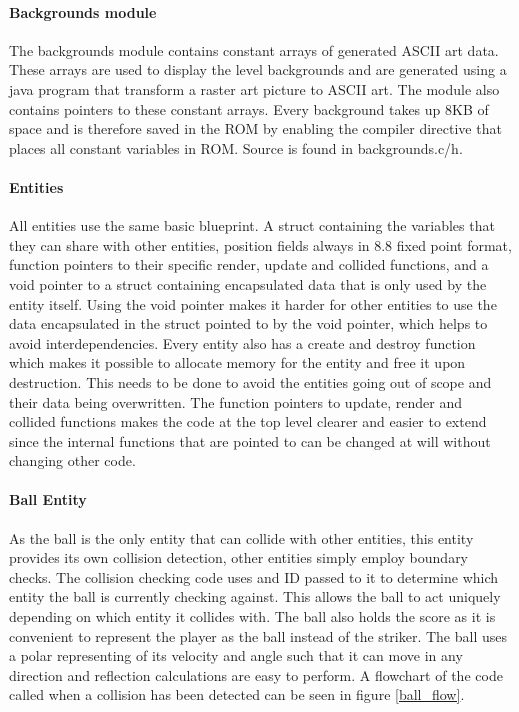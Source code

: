 \paragraph{Backgrounds module}
The backgrounds module contains constant arrays of generated ASCII art data. These arrays are used
to display the level backgrounds and are generated using a java program that transform a raster
art picture to ASCII art. The module also contains pointers to these constant arrays. Every
background takes up 8KB of space and is therefore saved in the ROM by enabling the compiler
directive that places all constant variables in ROM. Source is found in backgrounds.c/h.

\paragraph{Entities}
All entities use the same basic blueprint. A struct containing the variables that they can share
with other entities, position fields always in 8.8 fixed point format, function pointers
 to their specific render, update and collided functions, and
a void pointer to a struct containing encapsulated data that is only used by the entity itself. 
Using the void pointer makes it harder for other entities to use the data encapsulated in the
struct pointed to by the void pointer, which helps to avoid interdependencies. Every entity also
has a create and destroy function which makes it possible to allocate memory for the entity
and free it upon destruction. This needs to be done to avoid the entities going out of scope
and their data being overwritten. The function pointers to update, render and collided functions
makes the code at the top level clearer and easier to extend since the internal functions that
are pointed to can be changed at will without changing other code.

\paragraph{Ball Entity}
As the ball is the only entity that can collide with other entities, this entity provides its own 
collision detection, other entities simply employ boundary checks. The collision checking code
uses and ID passed to it to determine which entity the ball is currently checking against.
This allows the ball to act uniquely depending on which entity it collides with.
 The ball also holds the score
as it is convenient to represent the player as the ball instead of the striker. The ball
uses a polar representing of its velocity and angle such that it can move in any direction
and reflection calculations are easy to perform. A flowchart of the
 code called when a collision has been detected can be seen in figure \ref{ball_flow}.


